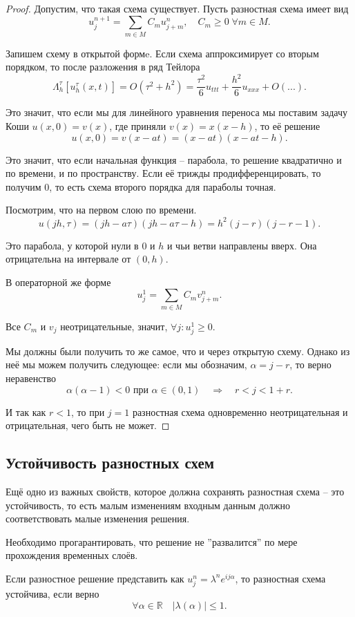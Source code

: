 \documentclass{article}
\begin{document}
\begin{proof}
	Допустим, что такая схема существует. Пусть разностная схема имеет вид
	\[u_j^{n+1}=\sum_{m\in M}C_m u_{j+m}^n,\quad C_m\ge 0\;\forall m\in M.\]

	Запишем схему в открытой формe. Если схема аппроксимирует со вторым
	порядком, то после разложения в ряд Тейлора
	\[\Lambda_h^\tau[u_h^\tau(x,t)]=O(\tau^2+h^2)=
	\frac{\tau^2}{6}u_{ttt}+\frac{h^2}{6}u_{xxx}+O(...).\]

	Это значит, что если мы для линейного уравнения переноса мы поставим
	задачу Коши $u(x,0)=v(x)$, где приняли $v(x)=x(x-h)$, то её решение
	\[u(x,0)=v(x-at)=(x-at)(x-at-h).\]

	Это значит, что если начальная функция -- парабола, то решение
	квадратично и по времени, и по пространству. Если её трижды
	продифференцировать, то получим 0, то есть схема второго порядка для
	параболы точная.

	Посмотрим, что на первом слою по времени.
	\[u(jh,\tau)=(jh-a\tau)(jh-a\tau-h)=h^2(j-r)(j-r-1).\]

	Это парабола, у которой нули в 0 и $h$ и чьи ветви направлены вверх. Она
	отрицательна на интервале от $(0,h)$.

	В операторной же форме
	\[u_j^1=\sum_{m\in M}C_m v_{j+m}^n.\]

	Все $C_m$ и $v_j$ неотрицательные, значит, $\forall j:u_j^1\ge 0$.

	Мы должны были получить то же самое, что и через открытую схему. Однако
	из неё мы можем получить следующее: если мы обозначим, $\alpha=j-r$, то
	верно неравенство
	\[\alpha(\alpha-1)<0\text{ при }\alpha\in(0,1)\quad\Rightarrow\quad
	r<j<1+r.\]

	И так как $r<1$, то при $j=1$ разностная схема одновременно
	неотрицательная и отрицательная, чего быть не может.
\end{proof}

\subsection{Устойчивость разностных схем}
Ещё одно из важных свойств, которое должна сохранять разностная схема -- это
устойчивость, то есть малым изменениям входным данным должно соответствовать
малые изменения решения.

Необходимо прогарантировать, что решение не ''развалится'' по мере прохождения
временных слоёв.

\begin{theorem}
	Если разностное решение представить как $u_j^n=\lambda^ne^{ij\alpha}$,
	то разностная схема устойчива, если верно
	\[\forall\alpha\in\mathbb R\quad|\lambda(\alpha)|\le 1.\]
\end{theorem}
\end{document}
